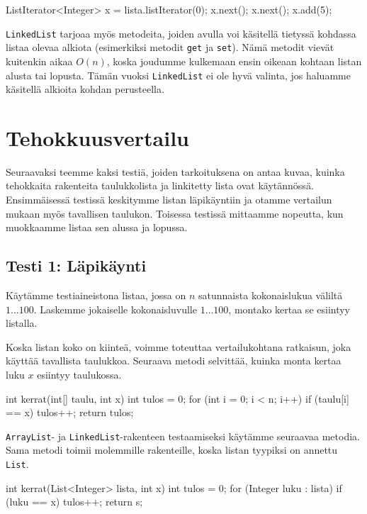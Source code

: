 \begin{code}
ListIterator<Integer> x = lista.listIterator(0);
x.next();
x.next();
x.add(5);
\end{code}

\texttt{LinkedList} tarjoaa myös metodeita,
joiden avulla voi käsitellä tietyssä kohdassa listaa olevaa alkiota
(esimerkiksi metodit \texttt{get} ja \texttt{set}).
Nämä metodit vievät kuitenkin aikaa $O(n)$,
koska joudumme kulkemaan ensin oikeaan kohtaan listan
alusta tai lopusta.
Tämän vuoksi \texttt{LinkedList} ei ole hyvä valinta,
jos haluamme käsitellä alkioita kohdan perusteella.

\section{Tehokkuusvertailu}

Seuraavaksi teemme kaksi testiä, joiden tarkoituksena on
antaa kuvaa, kuinka tehokkaita rakenteita
taulukkolista ja linkitetty lista ovat käytännössä.
Ensimmäisessä testissä keskitymme listan läpikäyntiin ja otamme
vertailun mukaan myös tavallisen taulukon.
Toisessa testissä mittaamme nopeutta, kun muokkaamme listaa
sen alussa ja lopussa.

\subsection{Testi 1: Läpikäynti}

Käytämme testiaineistona listaa, jossa on $n$ satunnaista
kokonaislukua väliltä $1 \dots 100$.
Laskemme jokaiselle kokonaisluvulle $1 \dots 100$,
montako kertaa se esiintyy listalla.

Koska listan koko on kiinteä, voimme toteuttaa vertailukohtana
ratkaisun, joka käyttää tavallista taulukkoa.
Seuraava metodi selvittää, kuinka monta kertaa luku $x$
esiintyy taulukossa.

\begin{code}
int kerrat(int[] taulu, int x) {
    int tulos = 0;
    for (int i = 0; i < n; i++) {
        if (taulu[i] == x) tulos++;
    }
    return tulos;
}
\end{code}

\texttt{ArrayList}- ja \texttt{LinkedList}-rakenteen
testaamiseksi käytämme seuraavaa metodia.
Sama metodi toimii molemmille rakenteille,
koska listan tyypiksi on annettu \texttt{List}.

\begin{code}
int kerrat(List<Integer> lista, int x) {
    int tulos = 0;
    for (Integer luku : lista) {
        if (luku == x) tulos++;
    }
    return s;
}
\end{code}

